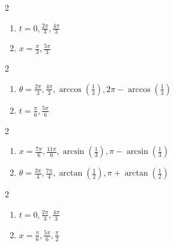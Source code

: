 \documentclass{ximera}
\begin{document}
\begin{multicols}{2}

\begin{enumerate}

\setcounter{enumi}{\value{HW}}

\item $t = 0, \frac{2\pi}{3}, \frac{4\pi}{3}$
\item  $x=\frac{\pi}{3}, \frac{5\pi}{3}$

\setcounter{HW}{\value{enumi}}

\end{enumerate}

\end{multicols}

\begin{multicols}{2}

\begin{enumerate}

\setcounter{enumi}{\value{HW}}

\item  $\theta = \frac{2\pi}{3}, \frac{4\pi}{3}, \arccos\left(\frac{1}{3}\right), 2\pi -\arccos\left(\frac{1}{3}\right) $
\item  $t=\frac{\pi}{6}, \frac{5\pi}{6}$

\setcounter{HW}{\value{enumi}}

\end{enumerate}

\end{multicols}

\begin{multicols}{2}

\begin{enumerate}

\setcounter{enumi}{\value{HW}}

\item  $x = \frac{7\pi}{6}, \frac{11\pi}{6}, \arcsin\left(\frac{1}{3}\right), \pi - \arcsin\left(\frac{1}{3}\right) $
\item  $\theta=\frac{3\pi}{4}, \frac{7\pi}{4}, \arctan\left(\frac{1}{2}\right), \pi +\arctan\left(\frac{1}{2}\right) $

\setcounter{HW}{\value{enumi}}

\end{enumerate}

\end{multicols}

\begin{multicols}{2}

\begin{enumerate}

\setcounter{enumi}{\value{HW}}

\item  $t=0, \frac{2\pi}{3}, \frac{4\pi}{3}$
\item  $x=\frac{\pi}{6}, \frac{5\pi}{6}, \frac{\pi}{2}$

\setcounter{HW}{\value{enumi}}

\end{enumerate}

\end{multicols}
\end{document}
